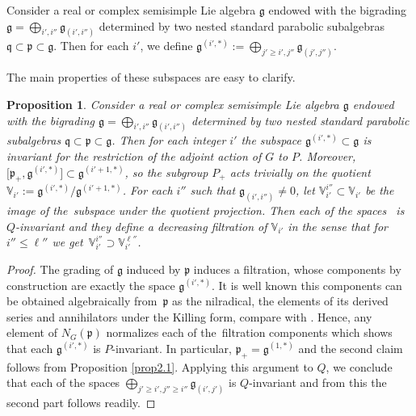 \documentclass[10pt,a4paper]{amsart}
\numberwithin{equation}{section}
\newtheorem{Proposition}[Theorem]{Proposition}
 { \theoremstyle{definition}
\newtheorem{Definition}[Theorem]{Definition}
\newtheorem{Example}[Theorem]{Example}
\newtheorem{Remark}[Theorem]{Remark} }
\def\frak{\mathfrak}
\def\Bbb{\mathbb}
\begin{document}
\begin{Definition}\label{def2.2}
 Consider a real or complex semisimple Lie algebra $\frak g$ endowed with the
 bigrading $\frak g=\bigoplus_{i',i''}\frak g_{(i',i'')}$ determined by two nested
 standard parabolic subalgebras $\frak q\subset\frak p\subset\frak g$. Then for each
 $i'$, we define $\frak g^{(i',*)}:=\bigoplus_{j'\geq i',j''}\frak g_{(j',j'')}$.
\end{Definition}

The main properties of these subspaces are easy to clarify.

\begin{Proposition}\label{prop2.2}
 Consider a real or complex semisimple Lie algebra $\frak g$ endowed with the
 bigrading $\frak g=\bigoplus_{i',i''}\frak g_{(i',i'')}$ determined by two nested
 standard parabolic subalgebras $\frak q\subset\frak p\subset\frak g$. Then for each
 integer $i'$ the subspace $\frak g^{(i',*)}\subset\frak g$ is invariant for the
 restriction of the adjoint action of $G$ to $P$. Moreover, $\bigl[\frak p_+,\frak
 g^{(i',*)}\bigr]\subset\frak g^{(i'+1,*)}$, so the subgroup $P_+$ acts trivially on the
 quotient $\Bbb V_{i'}:=\frak g^{(i',*)}/\frak g^{(i'+1,*)}$.
 For each $i''$ such that $\frak g_{(i',i'')}\neq 0$, let $\Bbb V^{i''}_{i'}\subset
 \Bbb V_{i'}$ be the image of the~subspace \smash{$\bigoplus_{j'\geq i',j''\geq i''}\frak
 g_{(j',j'')}\subset\frak g^{(i',*)}$} under the quotient projection. Then each of the
 spaces~\smash{$\Bbb V^{i''}_{i'}$} is $Q$-invariant and they define a decreasing filtration
 of $\Bbb V_{i'}$ in the sense that for $i''\leq \ell''$ we get~${\Bbb
 V^{i''}_{i'}\supset \Bbb V^{\ell''}_{i'}}$.
\end{Proposition}
\begin{proof}
 The grading of $\frak g$ induced by $\frak p$ induces a filtration, whose
 components by construction are exactly the space $\frak g^{(i',*)}$. It is well
 known this components can be obtained algebraically from~$\frak p$ as the
 nilradical, the elements of its derived series and annihilators under the Killing
 form, compare with \cite[Corollary 3.2.1]{book}. Hence, any element of $N_G(\frak
 p)$ normalizes each of the~filtration components which shows that each $\frak
 g^{(i',*)}$ is $P$-invariant. In particular, $\frak p_+=\frak g^{(1,*)}$ and the
 second claim follows from Proposition \ref{prop2.1}. Applying this argument to
 $Q$, we conclude that each of the spaces $\bigoplus_{j'\geq i',j''\geq i''}\frak
 g_{(i',j')}$ is $Q$-invariant and from this the second part follows readily.
\end{proof}
\end{document}
